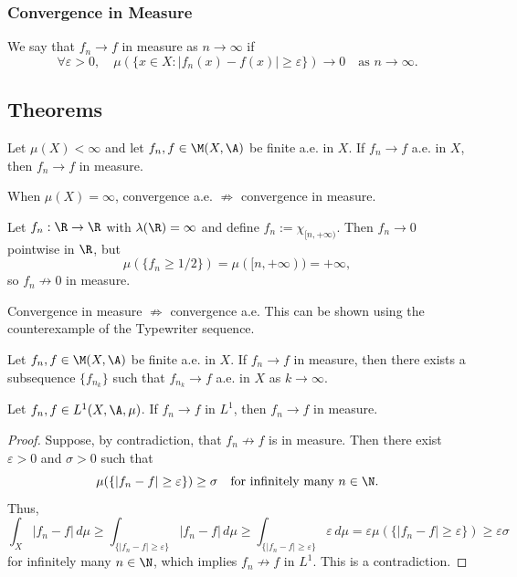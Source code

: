 \subsubsection{Convergence in Measure}
We say that $f_n \to f$ in measure as $n \to \infty$ if
\[
\forall \varepsilon > 0, \quad \mu(\{x \in X : |f_n(x) - f(x)| \geq \varepsilon\}) \to 0 \quad \text{as } n \to \infty.
\]

\clearpage
\subsection{Theorems}

\begin{theorem}
Let $\mu(X) < \infty$ and let $f_n, f \in \M(X,\A)$ be finite a.e. in $X$. If $f_n \to f$ a.e. in $X$, then $f_n \to f$ in measure.
\end{theorem}

\begin{remark}
When $\mu(X) = \infty$, convergence a.e. $\not\Rightarrow$ convergence in measure.
\end{remark}

\begin{example}
Let $f_n : \R \to \R$ with $\lambda(\R) = \infty$ and define $f_n := \chi_{[n, +\infty)}$. Then $f_n \to 0$ pointwise in $\R$, but
\[
\mu(\{f_n \geq 1/2\}) = \mu([n, +\infty)) = +\infty,
\]
so $f_n \not\to 0$ in measure.
\end{example}

\begin{remark}
Convergence in measure $\not\Rightarrow$ convergence a.e. This can be shown using the counterexample of the Typewriter sequence.
\end{remark}

\begin{theorem}
Let $f_n, f \in \M(X,\A)$ be finite a.e. in $X$. If $f_n \to f$ in measure, then there exists a subsequence $\{f_{n_k}\}$ such that $f_{n_k} \to f$ a.e. in $X$ as $k \to \infty$.
\end{theorem}

\begin{theorem}
Let $f_n, f \in L^1(X,\A,\mu)$. If $f_n \to f$ in $L^1$, then $f_n \to f$ in measure.
\end{theorem}

\begin{proof}
Suppose, by contradiction, that $f_n \not\to f$ is in measure. Then there exist $\varepsilon > 0$ and $\sigma > 0$ such that
\[
\mu(\{|f_n - f| \geq \varepsilon\}) \geq \sigma \quad \text{for infinitely many } n \in \N.
\]
Thus,
\[
\int_X |f_n - f| \, d\mu \geq \int_{\{|f_n - f| \geq \varepsilon\}} |f_n - f| \, d\mu \geq \int_{\{|f_n - f| \geq \varepsilon\}} \varepsilon \, d\mu = \varepsilon \mu(\{|f_n - f| \geq \varepsilon\}) \geq \varepsilon \sigma
\]
for infinitely many $n \in \N$, which implies $f_n \not\to f$ in $L^1$. This is a contradiction.
\end{proof}

